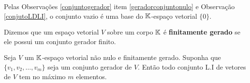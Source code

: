 \begin{observacao}
	Pelas Observa\c{c}\~oes \ref{conjuntogerador} item \ref{geradorconjuntonulo} e Observa\c{c}\~ao \ref{conjutoLDLI}, o conjunto vazio \'e uma base do $\mathbb{K}$-espa\c{c}o vetorial $\{0\}$.
\end{observacao}

\begin{definicao}
	Dizemos que um espa\c{c}o vetorial $V$ sobre um corpo $\mathbb{K}$ \'e \textbf{finitamente gerado} se ele possui um conjunto gerador finito.
\end{definicao}

\begin{proposicao}\label{conjuntoLI}
	Seja $V$ um $\mathbb{K}$-espa\c{c}o vetorial n\~ao nulo e finitamente gerado. Suponha que $\{v_1, v_2, \dots, v_m\}$ seja um conjunto gerador de $V$. Ent\~ao todo conjunto L.I de vetores de $V$ tem no m\'aximo $m$ elementos.
\end{proposicao}
